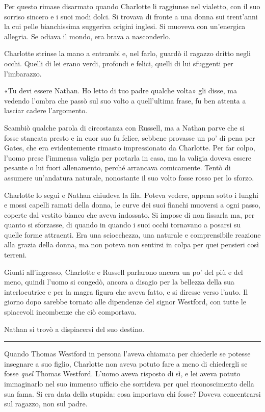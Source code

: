 Per questo rimase disarmato quando Charlotte li raggiunse nel vialetto, con il suo sorriso sincero e
i suoi modi dolci. Si trovava di fronte a una donna sui trent'anni la cui pelle bianchissima
suggeriva origini inglesi. Si muoveva con un'energica allegria. Se odiava il mondo, era brava a
nasconderlo.

Charlotte strinse la mano a entrambi e, nel farlo, guardò il ragazzo dritto negli occhi. Quelli di
lei erano verdi, profondi e felici, quelli di lui sfuggenti per l'imbarazzo.

«Tu devi essere Nathan. Ho letto di tuo padre qualche volta» gli disse, ma vedendo l'ombra che passò
sul suo volto a quell'ultima frase, fu ben attenta a lasciar cadere l'argomento.

Scambiò qualche parola di circostanza con Russell, ma a Nathan parve che si fosse stancata presto e
in cuor suo fu felice, sebbene provasse un po' di pena per Gates, che era evidentemente rimasto
impressionato da Charlotte. Per far colpo, l'uomo prese l'immensa valigia per portarla in casa, ma
la valigia doveva essere pesante o lui fuori allenamento, perché arrancava comicamente. Tentò di
assumere un'andatura naturale, nonostante il suo volto fosse rosso per lo sforzo.

Charlotte lo seguì e Nathan chiudeva la fila. Poteva vedere, appena sotto i lunghi e mossi capelli
ramati della donna, le curve dei suoi fianchi muoversi a ogni passo, coperte dal vestito bianco che
aveva indossato. Si impose di non fissarla ma, per quanto si sforzasse, di quando in quando i suoi
occhi tornavano a posarsi su quelle forme attraenti. Era una sciocchezza, una naturale e
comprensibile reazione alla grazia della donna, ma non poteva non sentirsi in colpa per quei
pensieri così terreni.

Giunti all'ingresso, Charlotte e Russell parlarono ancora un po' del più e del meno, quindi l'uomo
si congedò, ancora a disagio per la bellezza della sua interlocutrice e per la magra figura che
aveva fatto, e si diresse verso l'auto. Il giorno dopo sarebbe tornato alle dipendenze del signor
Westford, con tutte le spiacevoli incombenze che ciò comportava.

Nathan si trovò a dispiacersi del suo destino.

\plainbreak{1}

Quando Thomas Westford in persona l'aveva chiamata per chiederle se potesse insegnare a suo figlio,
Charlotte non aveva potuto fare a meno di chiedergli se fosse \emph{quel} Thomas Westford. L'uomo
aveva risposto di sì, e lei aveva potuto immaginarlo nel suo immenso ufficio che sorrideva per quel
riconoscimento della sua fama. Si era data della stupida: cosa importava chi fosse? Doveva
concentrarsi sul ragazzo, non sul padre.

